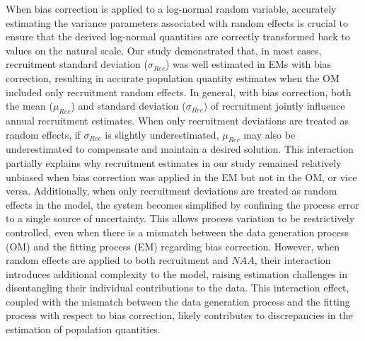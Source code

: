 \documentclass[
  12pt,
]{article}
\begin{document}
When bias correction is applied to a log-normal random variable,
accurately estimating the variance parameters associated with random
effects is crucial to ensure that the derived log-normal quantities are
correctly transformed back to values on the natural scale. Our study
demonstrated that, in most cases, recruitment standard deviation
(\(\sigma_{Rec}\)) was well estimated in EMs with bias correction,
resulting in accurate population quantity estimates when the OM included
only recruitment random effects. In general, with bias correction, both
the mean (\(\mu_{Rec}\)) and standard deviation (\(\sigma_{Rec}\)) of
recruitment jointly influence annual recruitment estimates. When only
recruitment deviations are treated as random effects, if
\(\sigma_{Rec}\) is slightly underestimated, \(\mu_{Rec}\) may also be
underestimated to compensate and maintain a desired solution. This
interaction partially explains why recruitment estimates in our study
remained relatively unbiased when bias correction was applied in the EM
but not in the OM, or vice versa. Additionally, when only recruitment
deviations are treated as random effects in the model, the system
becomes simplified by confining the process error to a single source of
uncertainty. This allows process variation to be restrictively
controlled, even when there is a mismatch between the data generation
process (OM) and the fitting process (EM) regarding bias correction.
However, when random effects are applied to both recruitment and
\(NAA\), their interaction introduces additional complexity to the
model, raising estimation challenges in disentangling their individual
contributions to the data. This interaction effect, coupled with the
mismatch between the data generation process and the fitting process
with respect to bias correction, likely contributes to discrepancies in
the estimation of population quantities.
\end{document}
